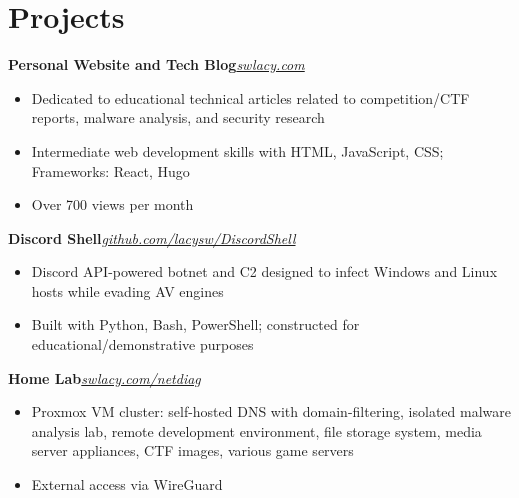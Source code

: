 \documentclass{article}
\newcommand{\topLevelProjectItem}[2]{
    \textbf{#1}\hfill \emph{#2}\newline
    \vspace{-18pt}\begin{itemize}
}
\newcommand{\topLevelItemEnd}{\end{itemize}\vspace{5pt}}
\newcommand{\lowLevelItem}[1]{
    \item\small{#1}\vspace{-8pt}
}
\begin{document}
    \section*{Projects}
        \topLevelProjectItem{Personal Website and Tech Blog}{\href{https://swlacy.com}{swlacy.com}}
            \lowLevelItem{Dedicated to educational technical articles related to competition/CTF reports, malware analysis, and security research}
            \lowLevelItem{Intermediate web development skills with HTML, JavaScript, CSS; Frameworks: React, Hugo}
            \lowLevelItem{Over 700 views per month}
        \topLevelItemEnd
        \topLevelProjectItem{Discord Shell}{\href{https://github.com/lacysw/DiscordShell}{github.com/lacysw/DiscordShell}}
            \lowLevelItem{Discord API-powered botnet and C2 designed to infect Windows and Linux hosts while evading AV engines}
            \lowLevelItem{Built with Python, Bash, PowerShell; constructed for educational/demonstrative purposes}
        \topLevelItemEnd
        \topLevelProjectItem{Home Lab}{\href{https://github.com/lacysw/DiscordShell}{\href{https://swlacy.com/netdiag}{swlacy.com/netdiag}}}
            \lowLevelItem{Proxmox VM cluster: self-hosted DNS with domain-filtering, isolated malware analysis lab, remote development environment, file storage system, media server appliances, CTF images, various game servers}
            \lowLevelItem{External access via WireGuard}
        \topLevelItemEnd
\end{document}
